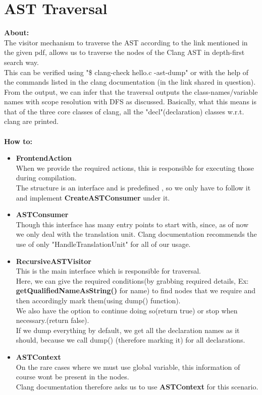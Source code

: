 \documentclass[12pt]{article}
\begin{document}
\section{AST Traversal}
 \textbf{About: }\\
 
 The visitor mechanism to traverse the AST according to the link mentioned in the given pdf, allows us to traverse the nodes of the Clang AST in depth-first search way.\\
This can be verified using "\$ clang-check hello.c -ast-dump" or with the help of the commands listed in the clang documentation (in the link shared in question).\\
From the output, we can infer that the traversal outputs the class-names/variable names with scope resolution with DFS as discussed. Basically, what this means is that of the three core classes of clang, all the "decl"(declaration) classes w.r.t. clang are printed.\\\\
 \textbf{How to: }\\

\begin{itemize}
\item \textbf{FrontendAction}\\
When we provide the required actions, this is responsible for executing those during compilation.\\
The structure is an interface and is predefined , so we only have to follow it and implement \textbf{CreateASTConsumer} under it.
\item \textbf{ASTConsumer}\\
Though this interface has many entry points to start with, since, as of now we only deal with the translation unit. Clang documentation recommends the use of only "HandleTranslationUnit" for all of our usage.
\item \textbf{RecursiveASTVisitor}\\
This is the main interface which is responsible for traversal.\\
Here, we can give the required conditions(by grabbing required details, Ex: \textbf{getQualifiedNameAsString()} for name) to find nodes that we require and then accordingly mark them(using dump() function).\\
We also have the option to continue doing so(return true) or stop when necessary.(return false).\\
If we dump everything by default, we get all the declaration names as it should, because we call dump() (therefore marking it) for all declarations.\\
\item \textbf{ASTContext}\\
On the rare cases where we must use global variable, this information of course wont be present in the nodes.\\
Clang documentation therefore asks us to use \textbf{ASTContext} for this scenario. 
\end{itemize}
 
\end{document}
